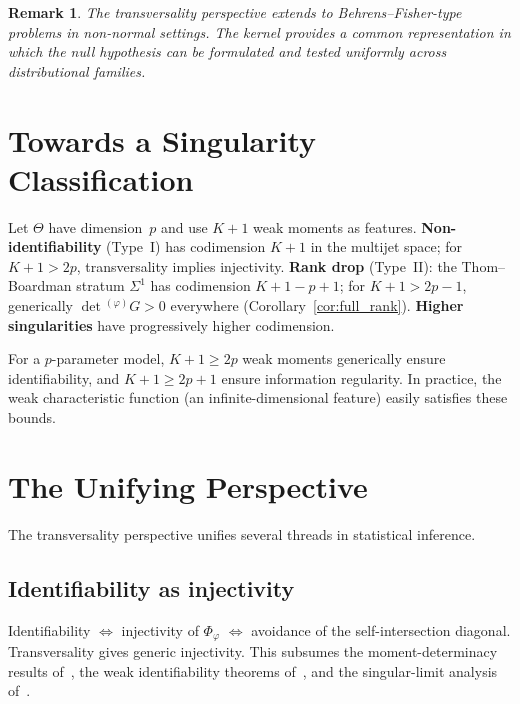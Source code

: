 \documentclass[11pt,a4paper]{article}
\newtheorem{remark}[theorem]{Remark}
\newcommand{\wG}{{}^{(\varphi)}\!G}
\begin{document}
\begin{remark}
The transversality perspective extends to Behrens--Fisher-type
problems in non-normal settings.  The kernel provides a common
representation in which the null hypothesis can be formulated and
tested uniformly across distributional families.
\end{remark}


\section{Towards a Singularity Classification}
\label{sec:classification}

Let $\Theta$ have dimension~$p$ and use $K+1$ weak moments as
features.  \textbf{Non-identifiability} (Type~I) has codimension
$K+1$ in the multijet space; for $K+1>2p$, transversality implies
injectivity.  \textbf{Rank drop} (Type~II): the Thom--Boardman
stratum $\Sigma^1$ has codimension $K+1-p+1$; for $K+1>2p-1$,
generically $\det\wG>0$ everywhere
(Corollary~\ref{cor:full_rank}).  \textbf{Higher singularities} have
progressively higher codimension.

For a $p$-parameter model, $K+1\ge 2p$ weak moments generically
ensure identifiability, and $K+1\ge 2p+1$ ensure information
regularity.  In practice, the weak characteristic function (an
infinite-dimensional feature) easily satisfies these bounds.


\section{The Unifying Perspective}
\label{sec:unification}

The transversality perspective unifies several threads in statistical
inference.

\subsection{Identifiability as injectivity}

Identifiability $\Leftrightarrow$ injectivity of $\Phi_\varphi$
$\Leftrightarrow$ avoidance of the self-intersection diagonal.
Transversality gives generic injectivity.  This subsumes the
moment-determinacy results of~\cite{Stoyanov2000}, the weak
identifiability theorems of~\cite[Theorems~6.2, 6.4 and~6.8]{A}, and the singular-limit
analysis of~\cite{E}.
\end{document}
